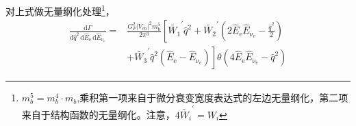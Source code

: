 对上式做无量纲化处理\footnote{$m_{b}^{5}=m_{b}^{4}\cdot m_{b}$,乘积第一项来自于微分衰变宽度表达式的左边无量纲化，第二项来自于结构函数的无量纲化。注意，$4\tilde{W_{i}}^{\prime}=W_{i}$}，
\begin{equation}
    \begin{aligned}
    \frac{\mathrm{d} \Gamma}{\mathrm{d} \hat{q}^2 \, \mathrm{d} \hat{E}_{\mathrm{e}} \, \mathrm{d} \hat{E}_{\mathrm{\nu_e}}} = & \frac{G_F^2 \left| V_{\mathrm{c b}} \right|^2 m_{\mathrm{b}}^5}{2 \pi^3} \left[ \tilde{W_1}^{\prime} \hat{q}^2 + \tilde{W_2}^{\prime} \left( 2 \hat{E}_{\mathrm{e}} \hat{E}_{\mathrm{\nu_e}} - \frac{\hat{q}^2}{2} \right) \right. \\
    & \left. + \tilde{W_3}^{\prime} \hat{q}^2 \left( \hat{E}_{\mathrm{e}} - \hat{E}_{\mathrm{\nu_e}} \right) \right] \theta \left( 4 \hat{E}_{\mathrm{e}} \hat{E}_{\mathrm{\nu_e}} - \hat{q}^2 \right)
    \end{aligned}
    \label{eq2:12}
    \end{equation}    
